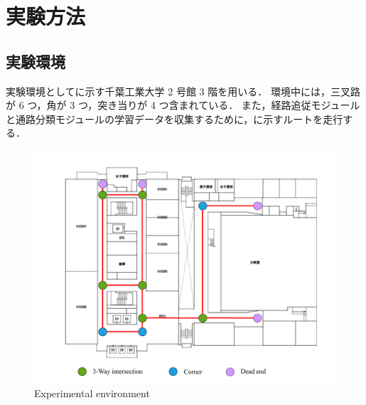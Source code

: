 \newpage
\section{実験方法}
\subsection{実験環境}
実験環境としてに示す千葉工業大学 2 号館 3 階を用いる．
環境中には，三叉路が 6 つ，角が 3 つ，突き当りが 4 つ含まれている．
また，経路追従モジュールと通路分類モジュールの学習データを収集するために，に示すルートを走行する．

\begin{figure}[htbp]
  \centering
  \includegraphics[width=130mm]{images/pdf/ishiguro/topo.pdf}
  \caption{Experimental environment}
  \label{fig:topo}
\end{figure}

